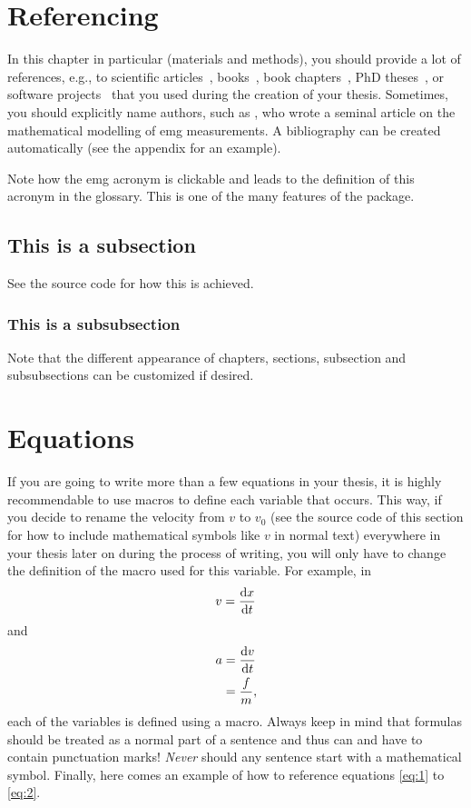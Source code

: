 \section{Referencing}
In this chapter in particular (materials and methods), you should provide a lot of references, e.g., to scientific articles~\cite{farina99}, books~\cite{plonsey07}, book chapters~\cite{rodriguez-falces12}, PhD theses~\cite{fevotte03}, or software projects~\cite{r-project} that you used during the creation of your thesis.
Sometimes, you should explicitly name authors, such as \textcite{farina99}, who wrote a seminal article on the mathematical modelling of \gls{emg} measurements.
A bibliography can be created automatically (see the appendix for an example).

Note how the \gls{emg} acronym is clickable and leads to the definition of this acronym in the glossary.
This is one of the many features of the  package.

\subsection{This is a subsection}
See the source code for how this is achieved.

\subsubsection{This is a subsubsection}
Note that the different appearance of chapters, sections, subsection and subsubsections can be customized if desired.

\section{Equations}
If you are going to write more than a few equations in your thesis, it is highly recommendable to use macros to define each variable that occurs.
This way, if you decide to rename the velocity from $v$ to $v_0$ (see the source code of this section for how to include mathematical symbols like $v$ in normal text) everywhere in your thesis later on during the process of writing, you will only have to change the definition of the macro used for this variable.
For example, in
\begin{equation}
  \label{eq:1}
  v = \frac{\mathrm{d} x}{\mathrm{d} t}
\end{equation}
and
\begin{align}
  \label{eq:2}
  a &= \frac{\mathrm{d} v}{\mathrm{d} t} \nonumber \\
  &= \frac{f}{m},
\end{align}
each of the variables is defined using a macro.
Always keep in mind that formulas should be treated as a normal part of a sentence and thus can and have to contain punctuation marks!
\emph{Never} should any sentence start with a mathematical symbol.
Finally, here comes an example of how to reference equations \eqref{eq:1} to \eqref{eq:2}.

